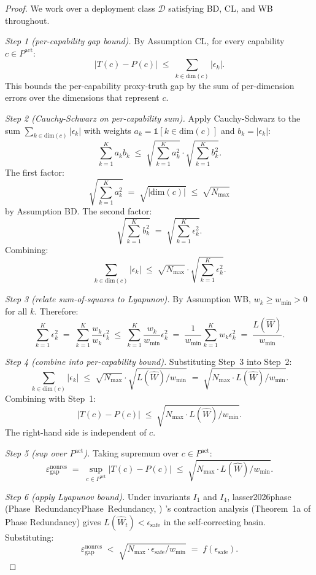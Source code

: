 \documentclass{article}
\makeatletter
\newcommand{\citep}[2][]{%
  \begingroup
  \def\@tmpkey{#2}%
  \ifx\@tmpkey\@empty\else
    (\ifx\@empty#1\@empty\else #1, \fi
     \@nameuse{bibkey@\@tmpkey})%
  \fi
  \endgroup
}
\newcommand{\Lyap}{L}
\newcommand{\Wm}{\hat{W}}
\newcommand{\epsnonres}{\varepsilon_{\mathrm{gap}}^{\mathrm{nonres}}}
\makeatother
\begin{document}
\begin{proof}
We work over a deployment class $\mathcal{D}$ satisfying BD, CL,
and WB throughout.

\emph{Step 1 (per-capability gap bound).}  By Assumption CL, for
every capability $c \in P^{\mathrm{act}}$:
\[
  |T(c) - P(c)| \;\leq\; \sum_{k \in \mathrm{dim}(c)} |\epsilon_k|.
\]
This bounds the per-capability proxy-truth gap by the sum of
per-dimension errors over the dimensions that represent $c$.

\emph{Step 2 (Cauchy-Schwarz on per-capability sum).}  Apply
Cauchy-Schwarz to the sum $\sum_{k \in \mathrm{dim}(c)} |\epsilon_k|$
with weights $a_k = \mathbb{1}[k \in \mathrm{dim}(c)]$ and
$b_k = |\epsilon_k|$:
\[
  \sum_{k=1}^{K} a_k b_k \;\leq\; \sqrt{\sum_{k=1}^{K} a_k^2}
  \cdot \sqrt{\sum_{k=1}^{K} b_k^2}.
\]
The first factor:
\[
  \sqrt{\sum_{k=1}^{K} a_k^2} \;=\; \sqrt{|\mathrm{dim}(c)|}
  \;\leq\; \sqrt{N_{\max}}
\]
by Assumption BD. The second factor:
\[
  \sqrt{\sum_{k=1}^{K} b_k^2} \;=\; \sqrt{\sum_{k=1}^{K} \epsilon_k^2}.
\]
Combining:
\[
  \sum_{k \in \mathrm{dim}(c)} |\epsilon_k|
  \;\leq\; \sqrt{N_{\max}} \cdot \sqrt{\sum_{k=1}^{K} \epsilon_k^2}.
\]

\emph{Step 3 (relate sum-of-squares to Lyapunov).}  By Assumption
WB, $w_k \geq w_{\min} > 0$ for all $k$. Therefore:
\[
  \sum_{k=1}^{K} \epsilon_k^2 \;=\; \sum_{k=1}^{K} \frac{w_k}{w_k} \epsilon_k^2
  \;\leq\; \sum_{k=1}^{K} \frac{w_k}{w_{\min}} \epsilon_k^2
  \;=\; \frac{1}{w_{\min}} \sum_{k=1}^{K} w_k \epsilon_k^2
  \;=\; \frac{\Lyap(\Wm)}{w_{\min}}.
\]

\emph{Step 4 (combine into per-capability bound).}  Substituting
Step~3 into Step~2:
\[
  \sum_{k \in \mathrm{dim}(c)} |\epsilon_k|
  \;\leq\; \sqrt{N_{\max}} \cdot \sqrt{\Lyap(\Wm) / w_{\min}}
  \;=\; \sqrt{N_{\max} \cdot \Lyap(\Wm) / w_{\min}}.
\]
Combining with Step~1:
\[
  |T(c) - P(c)| \;\leq\; \sqrt{N_{\max} \cdot \Lyap(\Wm) / w_{\min}}.
\]
The right-hand side is independent of $c$.

\emph{Step 5 (sup over $P^{\mathrm{act}}$).}  Taking supremum over
$c \in P^{\mathrm{act}}$:
\[
  \epsnonres \;=\; \sup_{c \in P^{\mathrm{act}}} |T(c) - P(c)|
  \;\leq\; \sqrt{N_{\max} \cdot \Lyap(\Wm) / w_{\min}}.
\]

\emph{Step 6 (apply Lyapunov bound).}  Under invariants $I_1$ and
$I_4$, \citep[Phase~Redundancy]{lasser2026phase}'s contraction
analysis (Theorem~1a of Phase Redundancy) gives
$\Lyap(\Wm_t) < \epsilon_{\mathrm{safe}}$ in the self-correcting
basin. Substituting:
\[
  \epsnonres \;<\; \sqrt{N_{\max} \cdot \epsilon_{\mathrm{safe}} / w_{\min}}
  \;=\; f(\epsilon_{\mathrm{safe}}).
\]


\end{proof}
\end{document}
